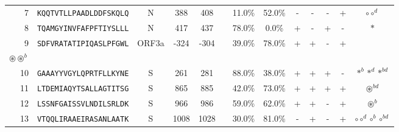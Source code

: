 \begin{tabular}{rcccccccccccc}
7  &  \texttt{KQQTVTLLPAADLDDFSKQLQ} &       N &    388 &   408 &                &                          11.0\% &                           52.0\% &          - &           - &          - &           + &                                                                                                             $ \circ \circ^d $ \\
8  &  \texttt{TQAMGYINVFAFPFTIYSLLL} &       N &    417 &   437 &                &                          78.0\% &                            0.0\% &          + &           - &          + &           - &                                                                                                                      $ \ast $ \\
9  &  \texttt{SDFVRATATIPIQASLPFGWL} &   ORF3a &   -324 &  -304 &                &                          39.0\% &                           78.0\% &          + &           + &          - &           + &                                           \Centerstack{  $\circ \circ^d \circ^b \circ^{bd}$ \\  $\circledast \circledast^b$ } \\
10 &  \texttt{GAAAYYVGYLQPRTFLLKYNE} &       S &    261 &   281 &                &                          88.0\% &                           38.0\% &          + &           + &          + &           - &                                                                                                   $ \ast^b \ast^d \ast^{bd} $ \\
11 &  \texttt{LTDEMIAQYTSALLAGTITSG} &       S &    865 &   885 &                &                          42.0\% &                           73.0\% &          + &           + &          + &           + &                                                                                                          $ \circledast^{bd} $ \\
12 &  \texttt{LSSNFGAISSVLNDILSRLDK} &       S &    966 &   986 &                &                          59.0\% &                           62.0\% &          + &           + &          - &           + &                                                                                                             $ \circledast^b $ \\
13 &  \texttt{VTQQLIRAAEIRASANLAATK} &       S &   1008 &  1028 &                &                          30.0\% &                           81.0\% &          - &           + &          - &           + &                                                                                          $ \circ \circ^d \circ^b \circ^{bd} $ \\

\end{tabular}
